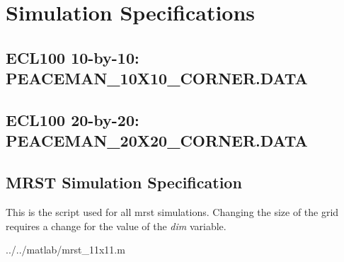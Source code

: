 
\section{Simulation Specifications} %
\label{sec:ecl100_simulation_specifications}

\subsection{ECL100 10-by-10: PEACEMAN\_10X10\_CORNER.DATA} %
\label{sub:peaceman_10x10_data}
{\footnotesize%
}
\clearpage

\subsection{ECL100 20-by-20: PEACEMAN\_20X20\_CORNER.DATA} %
\label{sub:peaceman_20x20_data}
{\footnotesize%
}
\clearpage

\subsection{MRST Simulation Specification} %
\label{sub:mrst_simulation_specification}
This is the script used for all mrst simulations. Changing the size of the grid requires a change for the value of the \emph{dim} variable.

  {../../matlab/mrst_11x11.m}

